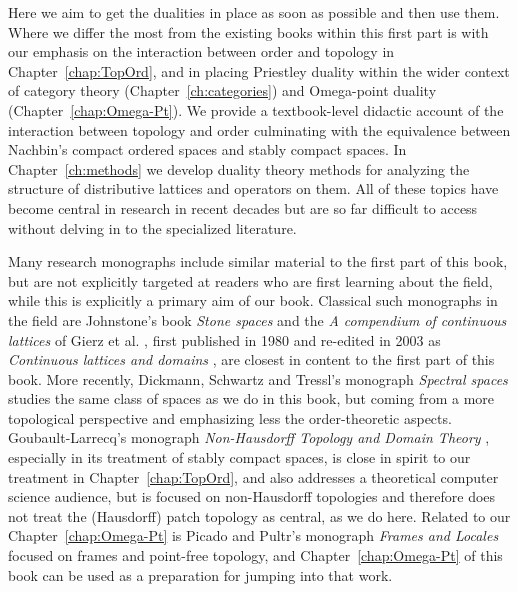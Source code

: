 Here we aim to get the dualities in place as soon as possible and then use them. Where we differ the most from the existing books within this first part is with our emphasis on the interaction between order and topology in Chapter~\ref{chap:TopOrd}, and in placing Priestley duality within the wider context of category theory (Chapter~\ref{ch:categories}) and Omega-point duality (Chapter~\ref{chap:Omega-Pt}). We provide a textbook-level didactic account of the interaction between topology and order culminating with the equivalence between Nachbin's compact ordered spaces and stably compact spaces. In Chapter~\ref{ch:methods} we develop duality theory methods for analyzing the structure of distributive lattices and operators on them. All of these topics have become central in research in recent decades but are so far difficult to access without delving in to the specialized literature.

Many research monographs include similar material to the first part of this book, but are not explicitly targeted at readers who are first learning about the field, while this is explicitly a primary aim of our book.
Classical such monographs in the field are Johnstone's book \emph{Stone spaces} \cite{Johnstone1986} and the \emph{A compendium of continuous lattices} of Gierz et al. \cite{Getc80}, first published in 1980 and re-edited in 2003 as \emph{Continuous lattices and domains} \cite{Getc2003}, are closest in content to the first part of this book. More recently, Dickmann, Schwartz and Tressl's monograph \emph{Spectral spaces} \cite{DicSchTre2019} studies the same class of spaces as we do in this book, but coming from a more topological perspective and emphasizing less the order-theoretic aspects. Goubault-Larrecq's monograph \emph{Non-Hausdorff Topology and Domain Theory} \cite{Goubault2013}, especially in its treatment of stably compact spaces, is close in spirit to our treatment in Chapter~\ref{chap:TopOrd}, and also addresses a theoretical computer science audience, but is focused on non-Hausdorff topologies and therefore does not treat the (Hausdorff) patch topology as central, as we do here. Related to our Chapter~\ref{chap:Omega-Pt} is Picado and Pultr's monograph \emph{Frames and Locales} \cite{PicPul2012} focused on frames and point-free topology, and Chapter~\ref{chap:Omega-Pt} of this book can be used as a preparation for jumping into that work. 


